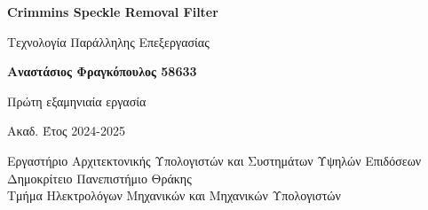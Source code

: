 \begin{titlepage}
    \begin{center}
        \vspace*{1.5cm}

        \textbf{\LARGE Crimmins Speckle Removal Filter}

        \vspace{0.5cm}
        {\large Τεχνολογία Παράλληλης Επεξεργασίας}

        \vspace{1.5cm}

        \textbf{Αναστάσιος Φραγκόπουλος 58633}

        \vfill

        Πρώτη εξαμηνιαία εργασία

        Ακαδ. Έτος 2024-2025

        \vspace{0.8cm}

        Εργαστήριο Αρχιτεκτονικής Υπολογιστών και Συστημάτων Υψηλών Επιδόσεων\\
        Δημοκρίτειο Πανεπιστήμιο Θράκης\\
        Τμήμα Ηλεκτρολόγων Μηχανικών και Μηχανικών Υπολογιστών\\

    \end{center}
\end{titlepage}
